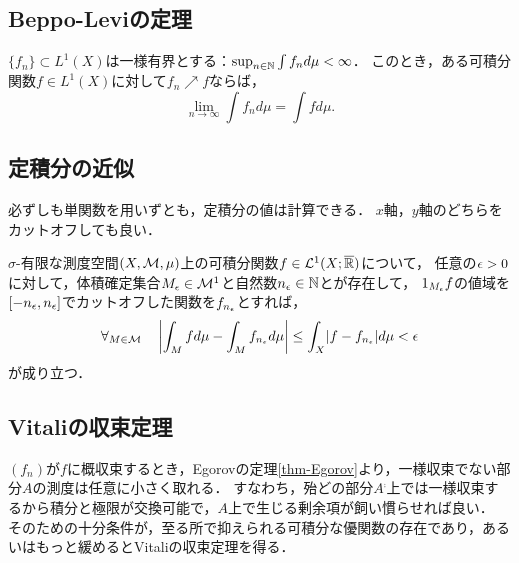\documentclass[uplatex, dvipdfmx]{jsreport}
\begin{document}
\subsection{Beppo-Leviの定理}

\begin{theorem}
    $\{f_n\}\subset L^1(X)$は一様有界とする：$\sup_{n\in\mathbb{N}}\int f_nd\mu<\infty$．
    このとき，ある可積分関数$f\in L^1(X)$に対して$f_n\nearrow f$ならば，
    \[\lim_{n\to\infty}\int f_nd\mu=\int fd\mu.\]
\end{theorem}

\subsection{定積分の近似}

\begin{tcolorbox}[colframe=ForestGreen, colback=ForestGreen!10!white,breakable,colbacktitle=ForestGreen!40!white,coltitle=black,fonttitle=\bfseries\sffamily,
title=]
    必ずしも単関数を用いずとも，定積分の値は計算できる．
    $x$軸，$y$軸のどちらをカットオフしても良い．
\end{tcolorbox}

\begin{theorem}
    $\sigma$-有限な測度空間$(X,\mathcal{M},\mu)$上の可積分関数$f\in\mathcal{L}^1(X;\overline{\mathbb{R}})$について，
    任意の$\epsilon>0$に対して，体積確定集合$M_\epsilon\in\mathcal{M}^1$と自然数$n_\epsilon\in\mathbb{N}$とが存在して，
    $1_{M_\epsilon}f$の値域を$[-n_\epsilon,n_\epsilon]$でカットオフした関数を$f_{n_\epsilon}$とすれば，
    \[\forall_{M\in\mathcal{M}}\quad\left|\int_Mfd\mu-\int_Mf_{n_\epsilon}d\mu\right|\le\int_X\lvert f-f_{n_\epsilon}\rvert d\mu<\epsilon\]
    が成り立つ．
\end{theorem}

\subsection{Vitaliの収束定理}\label{subsec-Vitali-convergence-theorem}

\begin{tcolorbox}[colframe=ForestGreen, colback=ForestGreen!10!white,breakable,colbacktitle=ForestGreen!40!white,coltitle=black,fonttitle=\bfseries\sffamily,
title=Lebesgueの優収束定理の描像と精緻化]
    $(f_n)$が$f$に概収束するとき，Egorovの定理\ref{thm-Egorov}より，一様収束でない部分$A$の測度は任意に小さく取れる．
    すなわち，殆どの部分$A^\comp$上では一様収束するから積分と極限が交換可能で，$A$上で生じる剰余項が飼い慣らせれば良い．
    そのための十分条件が，至る所で抑えられる可積分な優関数の存在であり，あるいはもっと緩めるとVitaliの収束定理を得る．
\end{tcolorbox}
\end{document}
